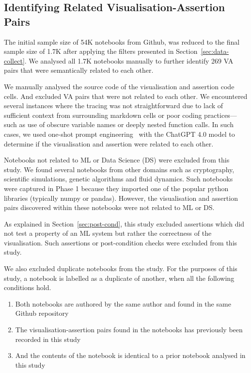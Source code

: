 \documentclass[conference]{IEEEtran}
\begin{document}
\subsection{Identifying Related Visualisation-Assertion Pairs}\label{sec:identify-related-pairs}

The initial sample size of 54K notebooks from Github, was reduced to the final sample size of 1.7K after applying the filters presented in Section~\ref{sec:data-collect}. We analysed all 1.7K notebooks manually to further identify 269 VA pairs that were semantically related to each other.

We manually analysed the source code of the visualisation and assertion code cells. And excluded VA pairs that were not related to each other. We encountered several instances where the tracing was not straightforward due to lack of sufficient context from surrounding markdown cells or poor coding practices---such as use of obscure variable names or deeply nested function calls. In such cases, we used one-shot prompt engineering~\cite{liu2023pretrain} with the ChatGPT 4.0 model to determine if the visualisation and assertion were related to each other.

Notebooks not related to ML or Data Science (DS) were excluded from this study. We found several notebooks from other domains such as cryptography, scientific simulations, genetic algorithms and fluid dynamics. Such notebooks were captured in Phase 1 because they imported one of the popular python libraries (typically numpy or pandas). However, the visualisation and assertion pairs discovered within these notebooks were not related to ML or DS.

As explained in Section~\ref{sec:post-cond}, this study excluded assertions which did not test a property of an ML system but rather the correctness of the visualisation. Such assertions or post-condition checks were excluded from this study.

We also excluded duplicate notebooks from the study. For the purposes of this study, a notebook is labelled as a duplicate of another, when all the following conditions hold.

\begin{enumerate}
  \item Both notebooks are authored by the same author and found in the same Github repository
  \item The visualisation-assertion pairs found in the notebooks has previously been recorded in this study
  \item And the contents of the notebook is identical to a prior notebook analysed in this study
\end{enumerate}
\end{document}
